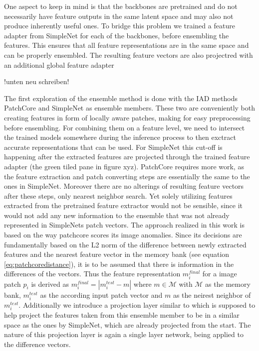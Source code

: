 One aspect to keep in mind is that the backbones are pretrained and do not necessarily have feature outputs in the same latent space %
and may also not produce inherently useful ones. To bridge this problem we trained a feature adapter from SimpleNet for each of the backbones, before ensembling the features. 
This ensures that all feature representations are in the same space and can be properly ensembled. The resulting feature vectors are also projectred with an additional global 
feature adapter

!unten neu schreiben!


The first exploration of the ensemble method is done with the IAD methods PatchCore \cite{patchCore2022} and SimpleNet \cite{liu2023simplenet} as ensemble members. These two 
are conveniently both creating features in form of locally aware patches, making for easy preprocessing before ensembling. For combining them on a 
feature level, we need to intersect the trained models somewhere during the inference process to then exctract accurate representations that can be used. 
For SimpleNet this cut-off is happening after the extracted features are projected through the trained feature adapter (the green tiled pane in figure xyz). 
PatchCore requires more work, as the feature extraction and patch converting steps are essentially the same to the ones in SimpleNet. Moreover there are no alterings of resulting feature vectors 
after these steps, only nearest neighbor search. Yet solely utilizing features extracted 
from the pretrained feature extractor would not be sensible, since it would not add any new information to the ensemble that was not already represented in SimpleNets patch vectors. 
The approach realized in this work is based on the way patchcore scores its image anomalies. Since its decisions are fundamentally based on the L2 norm of the difference between newly extracted 
features and the nearest feature vector in the memory bank (see equation \ref{eq:patchcoredistance}), it is to be assumed that there is information in the differences of the vectors. Thus the 
feature representation $m^{final}_i$ for a image patch $p_i$ is derived as $m^{final}_i = | m_i^{test} - m |$ where $m \in \mathcal{M}$ with $\mathcal{M}$ as the memory bank, $m_i^{test}$ as the 
according input patch vector and $m$ as the neirest neighbor of $m_i^{test}$. Additionally we introduce a projection layer similar to \cite{liu2023simplenet} which is supposed to help project the 
features taken from this ensemble member to be in a similar space as the ones by SimpleNet, which are already projected from the start. The nature of this projection layer is again a single 
layer network, being applied to the difference vectors.



